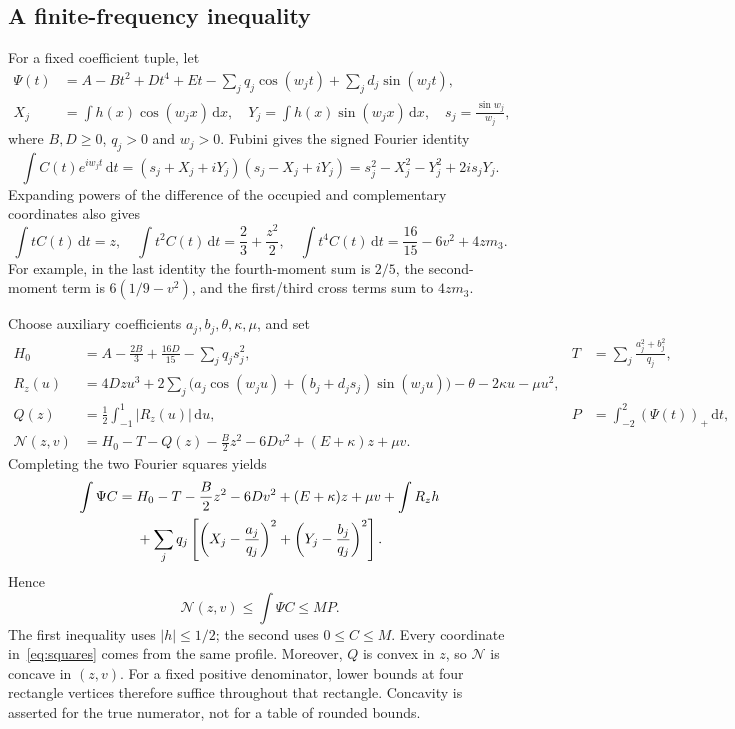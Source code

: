 \documentclass[10pt]{article}
\newcommand{\pos}[1]{(#1)_+}
\newcommand{\dd}{\,\mathrm d}
\newcommand{\Ncal}{\mathcal N}
\begin{document}
\subsection{A finite-frequency inequality}
For a fixed coefficient tuple, let
\begin{align*}
\Psi(t)&=A-Bt^2+Dt^4+Et-\sum_j q_j\cos(w_jt)+\sum_j d_j\sin(w_jt),\\
X_j&=\int h(x)\cos(w_jx)\dd x,\quad
Y_j=\int h(x)\sin(w_jx)\dd x,\quad s_j=\frac{\sin w_j}{w_j},
\end{align*}
where $B,D\geq0$, $q_j>0$ and $w_j>0$.
Fubini gives the signed Fourier identity
\[
\int C(t)e^{iw_jt}\dd t
=(s_j+X_j+iY_j)(s_j-X_j+iY_j)
=s_j^2-X_j^2-Y_j^2+2is_jY_j.
\]
Expanding powers of the difference of the occupied and complementary coordinates also gives
\begin{equation}\label{eq:moments}
\int tC(t)\dd t=z,\quad
\int t^2C(t)\dd t=\frac23+\frac{z^2}2,\quad
\int t^4C(t)\dd t=\frac{16}{15}-6v^2+4zm_3.
\end{equation}
For example, in the last identity the fourth-moment sum is $2/5$, the second-moment term is $6(1/9-v^2)$, and the first/third cross terms sum to $4zm_3$.

Choose auxiliary coefficients $a_j,b_j,\theta,\kappa,\mu$, and set
\begin{align*}
H_0&=A-\frac{2B}3+\frac{16D}{15}-\sum_j q_js_j^2,
& T&=\sum_j\frac{a_j^2+b_j^2}{q_j},\\
R_z(u)&=4Dzu^3+2\sum_j\bigl(a_j\cos(w_ju)+(b_j+d_js_j)\sin(w_ju)\bigr)
              -\theta-2\kappa u-\mu u^2,\\
Q(z)&=\frac12\int_{-1}^1|R_z(u)|\dd u,
& P&=\int_{-2}^2\pos{\Psi(t)}\dd t,\\
\Ncal(z,v)&=H_0-T-Q(z)-\frac B2z^2-6Dv^2+(E+\kappa)z+\mu v.
\end{align*}
Completing the two Fourier squares yields
\begin{align}
\int\Psi C
={}&H_0-T-\frac B2z^2-6Dv^2+(E+\kappa)z+\mu v+\int R_zh\notag\\
&+\sum_jq_j\left[\left(X_j-\frac{a_j}{q_j}\right)^2
                 +\left(Y_j-\frac{b_j}{q_j}\right)^2\right].\label{eq:squares}
\end{align}
Hence
\begin{equation}\label{eq:row}
\Ncal(z,v)\leq\int\Psi C\leq MP.
\end{equation}
The first inequality uses $|h|\leq1/2$; the second uses $0\leq C\leq M$.
Every coordinate in~\eqref{eq:squares} comes from the same profile.
Moreover, $Q$ is convex in $z$, so $\Ncal$ is concave in $(z,v)$.
For a fixed positive denominator, lower bounds at four rectangle vertices therefore suffice throughout that rectangle. Concavity is asserted for the true numerator, not for a table of rounded bounds.
\end{document}
